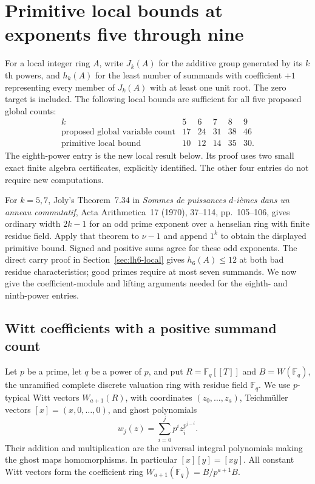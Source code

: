 \documentclass[11pt,reqno]{amsart}
\numberwithin{equation}{section}
\theoremstyle{definition}
\begin{document}
\section{Primitive local bounds at exponents five through nine}
\label{sec:higher-local-bounds}

For a local integer ring $A$, write $J_k(A)$ for the additive group
generated by its $k$th powers, and $h_k(A)$ for the least number of
summands with coefficient $+1$ representing every member of $J_k(A)$ with at least
one unit root. The zero target is included. The following local bounds
are sufficient for all five proposed global counts:
\[
 \begin{array}{c|ccccc}
 k&5&6&7&8&9\\\hline
 \text{proposed global variable count}&17&24&31&38&46\\
 \text{primitive local bound}&10&12&14&35&30.
 \end{array}
\]
The eighth-power entry is the new local result below. Its proof uses
two small exact finite algebra certificates, explicitly identified.
The other four entries do not require new computations.

For $k=5,7$, Joly's Theorem~7.34 in \emph{Sommes de puissances
$d$-i\`emes dans un anneau commutatif}, Acta Arithmetica~17 (1970),
37--114, pp.~105--106, gives ordinary width $2k-1$ for an odd prime
exponent over a henselian ring with finite residue field. Apply that
theorem to $\nu-1$ and append $1^k$ to obtain the displayed primitive
bound. Signed and positive sums agree for these odd exponents.
The direct carry proof in Section~\ref{sec:lh6-local} gives
$h_6(A)\le12$ at both bad residue characteristics; good primes require
at most seven summands. We now give the coefficient-module and lifting
arguments needed for the eighth- and ninth-power entries.

\subsection{Witt coefficients with a positive summand count}
\label{sec:higher-witt-coefficients}

Let $p$ be a prime, let $q$ be a power of $p$, and put
$R=\mathbb F_q[[T]]$ and $B=W(\mathbb F_q)$, the unramified complete
discrete valuation ring with residue field $\mathbb F_q$.
We use $p$-typical Witt vectors $W_{a+1}(R)$, with coordinates
$(z_0,\ldots,z_a)$, Teichm\"uller vectors $[x]=(x,0,\ldots,0)$,
and ghost polynomials
\[
 w_j(z)=\sum_{i=0}^j p^i z_i^{p^{j-i}}.
\]
Their addition and multiplication are the universal integral
polynomials making the ghost maps homomorphisms. In particular
$[x][y]=[xy]$. All constant Witt vectors form the coefficient ring
$W_{a+1}(\mathbb F_q)=B/p^{a+1}B$.
\end{document}
